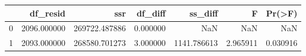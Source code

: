 \begin{tabular}{lrrrrrr}
\toprule
 & df_resid & ssr & df_diff & ss_diff & F & Pr(>F) \\
\midrule
0 & 2096.000000 & 269722.487886 & 0.000000 & NaN & NaN & NaN \\
1 & 2093.000000 & 268580.701273 & 3.000000 & 1141.786613 & 2.965911 & 0.030916 \\
\bottomrule
\end{tabular}

